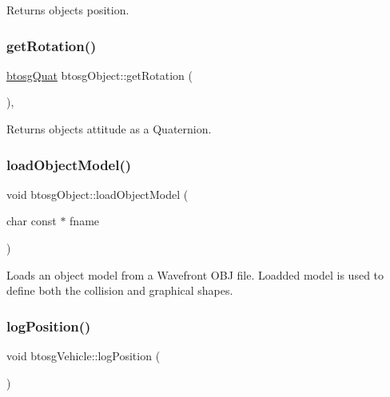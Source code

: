 Returns object\textquotesingle{}s position. \mbox{\label{classbtosgObject_a3b825999ad3a51bde743d4085ff19dae}} 
\subsubsection{\texorpdfstring{getRotation()}{getRotation()}}
{\footnotesize\ttfamily \mbox{\hyperlink{classbtosgQuat}{btosg\+Quat}} btosg\+Object\+::get\+Rotation (\begin{DoxyParamCaption}{ }\end{DoxyParamCaption})\hspace{0.3cm}{\ttfamily [inline]}, {\ttfamily [inherited]}}

Returns object\textquotesingle{}s attitude as a Quaternion. \mbox{\label{classbtosgObject_a91838b8235579da178fcc06e6d3d47f3}} 
\subsubsection{\texorpdfstring{loadObjectModel()}{loadObjectModel()}}
{\footnotesize\ttfamily void btosg\+Object\+::load\+Object\+Model (\begin{DoxyParamCaption}\item[{char const $\ast$}]{fname }\end{DoxyParamCaption})\hspace{0.3cm}{\ttfamily [inherited]}}

Loads an object model from a Wavefront O\+BJ file. Loadded model is used to define both the collision and graphical shapes. \mbox{\label{classbtosgVehicle_ae9168c62263b26f95d068d94d6a7cab7}} 
\subsubsection{\texorpdfstring{logPosition()}{logPosition()}}
{\footnotesize\ttfamily void btosg\+Vehicle\+::log\+Position (\begin{DoxyParamCaption}{ }\end{DoxyParamCaption})\hspace{0.3cm}{\ttfamily [inline]}}

